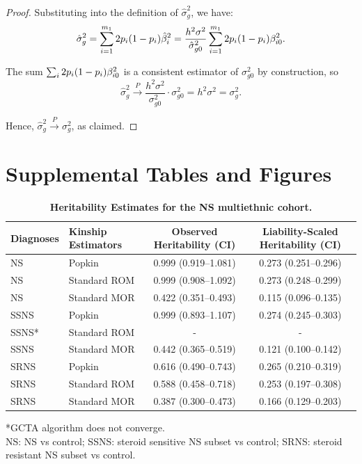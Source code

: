 \documentclass[11pt]{article}
\newcommand{\beginsupplement}{%
  \setcounter{table}{0}
  \renewcommand{\thetable}{S\arabic{table}}%
  \setcounter{figure}{0}
  \renewcommand{\thefigure}{S\arabic{figure}}%
  \setcounter{section}{0}
  \renewcommand{\thesection}{S\arabic{section}}%
  \setcounter{equation}{0}
  \renewcommand{\theequation}{S\arabic{equation}}%
  \setcounter{page}{1}
  \renewcommand{\thepage}{S\arabic{page}}%
}
\begin{document}
\begin{appendices}
\begin{proof}
Substituting into the definition of \( \hat{\sigma}_g^2 \), we have:
\[
\hat{\sigma}_g^2 = \sum_{i=1}^{m_1} 2 p_{i}  (1 -  p_{i}  ) \hat{\beta}_i^2 = \frac{h^2 \sigma^2}{\hat{\sigma}_{g0}^2} \sum_{i=1}^{m_1} 2 p_{i}  (1 -  p_{i}  ) \beta_{i0}^2.
\]

The sum \( \sum_{i} 2 p_{i}  (1 -  p_{i}  ) \beta_{i0}^2 \) is a consistent estimator of \( \sigma_{g0}^2 \) by construction, so
\[
\hat{\sigma}_g^2 \xrightarrow{P} \frac{h^2 \sigma^2}{\sigma_{g0}^2} \cdot \sigma_{g0}^2 = h^2 \sigma^2 = \sigma_g^2.
\]

Hence, \( \hat{\sigma}_g^2 \xrightarrow{P} \sigma_g^2 \), as claimed.
\end{proof}

\end{appendices}


\clearpage

\beginsupplement

\section{Supplemental Tables and Figures}


\begin{table}[h!]
  \centering
  \small
  \caption{
    \textbf{Heritability Estimates for the NS multiethnic cohort.}
  }
  \label{tab:NS_herit_table}
  \begin{tabular}{l l c c}
    \toprule
    Diagnoses & Kinship Estimators & Observed Heritability (CI) & Liability-Scaled Heritability (CI) \\
    \midrule
    NS   & Popkin        & 0.999 (0.919–1.081)  & 0.273 (0.251–0.296) \\
    NS   & Standard ROM  & 0.999 (0.908–1.092)  & 0.273 (0.248–0.299) \\
    NS   & Standard MOR  & 0.422 (0.351–0.493)  & 0.115 (0.096–0.135) \\
    SSNS & Popkin        & 0.999 (0.893–1.107)  & 0.274 (0.245–0.303) \\
    SSNS* & Standard ROM & -                    & - \\
    SSNS & Standard MOR  & 0.442 (0.365–0.519)  & 0.121 (0.100–0.142) \\
    SRNS & Popkin        & 0.616 (0.490–0.743)  & 0.265 (0.210–0.319) \\
    SRNS & Standard ROM  & 0.588 (0.458–0.718)  & 0.253 (0.197–0.308) \\
    SRNS & Standard MOR  & 0.387 (0.300–0.473)  & 0.166 (0.129–0.203) \\
    \bottomrule
  \end{tabular}
  \begin{flushleft} 
    *GCTA algorithm does not converge. \\
     NS: NS vs control; SSNS: steroid sensitive NS subset vs control; SRNS: steroid resistant NS subset vs control.
  \end{flushleft}
\end{table}
\end{document}

